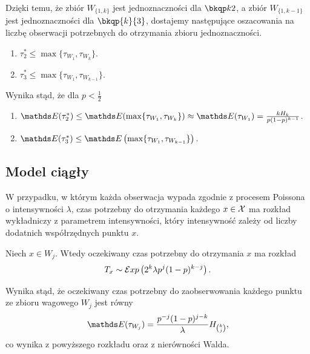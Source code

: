 \noindent
Dzięki temu, że zbiór $W_{\{1,k\}}$ jest jednoznaczności dla $\ising$, a zbiór $W_{\{1,k-1\}}$ jest jednoznaczności dla $\bkqp{k}{3}$, dostajemy następujące oszacowania na liczbę obserwacji potrzebnych do otrzymania zbioru jednoznaczności.
\begin{remark}
\leavevmode
\makeatletter
\@nobreaktrue
\makeatother
\begin{enumerate}
\item $\tau^*_2 \leq \max\{\tau_{W_1},\tau_{W_k}\}$.
\item $\tau^*_3 \leq \max\{\tau_{W_1},\tau_{W_{k-1}}\}$.
\end{enumerate}
Wynika stąd, że dla $p<\frac12$
\begin{enumerate}
\item $\EE(\tau^*_2) \leq \EE(\max\{\tau_{W_1},\tau_{W_k}\}) \approx \EE(\tau_{W_1}) = \frac{kH_k}{p(1-p)^{k-1}}$.
\item $\EE(\tau^*_3) \leq \EE\left(\max\{\tau_{W_1},\tau_{W_{k-1}}\}\right)$.
\end{enumerate}
\end{remark}



\subsection{Model ciągły}
\noindent
W przypadku, w którym każda obserwacja wypada zgodnie z procesem Poissona o intensywności $\lambda$, czas potrzebny do otrzymania każdego $x\in\mathcal{X}$ ma rozkład wykładniczy z parametrem intensywności, który intensywność zależy od liczby dodatnich współrzędnych punktu $x$.
\begin{proposition}
Niech $x\in W_j$. Wtedy oczekiwany czas potrzebny do otrzymania $x$ ma rozkład
$$
T_x \sim \mathcal{E}xp\left( {2^k \lambda}{p^j (1-p)^{k-j}} \right).
$$
\end{proposition}
\noindent
Wynika stąd, że oczekiwany czas potrzebny do zaobserwowania każdego punktu ze zbioru wagowego $W_j$ jest równy
$$
\EE(\tau_{W_j}) = \frac{p^{-j}(1-p)^{j-k}}{\lambda}H_{\binom{k}{j}},
$$   
co wynika z powyższego rozkładu oraz z nierówności Walda.



